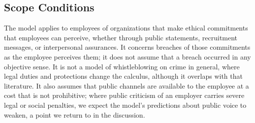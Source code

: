 \subsection{Scope Conditions}

The model applies to employees of organizations that make ethical commitments that employees can perceive, whether through public statements, recruitment messages, or interpersonal assurances. It concerns breaches of those commitments as the employee perceives them; it does not assume that a breach occurred in any objective sense. It is not a model of whistleblowing on crime in general, where legal duties and protections change the calculus, although it overlaps with that literature. It also assumes that public channels are available to the employee at a cost that is not prohibitive; where public criticism of an employer carries severe legal or social penalties, we expect the model's predictions about public voice to weaken, a point we return to in the discussion.

